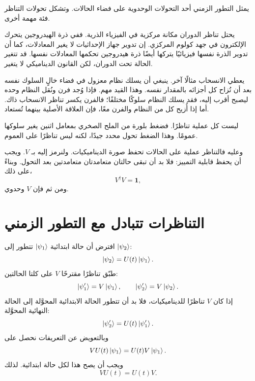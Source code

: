 يمثل التطور الزمني أحد التحولات الوحدوية على فضاء الحالات. وتشكل تحولات التناظر فئة مهمة أخرى.

يحتل تناظر الدوران مكانة مركزية في الفيزياء الذرية. ففي ذرة الهيدروجين يتحرك الإلكترون في جهد كولوم المركزي. إن تدوير جهاز الإحداثيات لا يغير المعادلات، كما أن تدوير الذرة نفسها فيزيائيًا يتركها أيضًا ذرة هيدروجين تحكمها المعادلات نفسها. قد تتغير الحالة تحت الدوران، لكن القانون الديناميكي لا يتغير.

يعطي الانسحاب مثالًا آخر. ينبغي أن يسلك نظام معزول في فضاء خالٍ السلوك نفسه بعد أن تُزاح كل أجزائه بالمقدار نفسه. وهذا القيد مهم. فإذا وُجد فرن ونُقل النظام وحده ليصبح أقرب إليه، فقد يسلك النظام سلوكًا مختلفًا؛ فالفرن يكسر تناظر الانسحاب ذاك. أما إذا أُزيح كل من النظام والفرن معًا، فإن العلاقة الأصلية بينهما تُستعاد.

ليست كل عملية تناظرًا. فضغط بلورة من الملح الصخري بمعامل اثنين يغير سلوكها عمومًا. وهذا الضغط تحول محدد جيدًا، لكنه ليس تناظرًا على العموم.

وعليه فالتناظر عملية على الحالات تحفظ صورة الديناميكيات. ولنرمز إليه بـ \(V\). ويجب أن يحفظ قابلية التمييز: فلا بد أن تبقى حالتان متعامدتان متعامدتين بعد التحول. وبناءً على ذلك،
\begin{equation}
V^\dagger V=\mathbf 1,
\end{equation}
ومن ثم فإن \(V\) وحدوي.

\section{التناظرات تتبادل مع التطور الزمني}

افترض أن حالة ابتدائية \(\left\lvert\psi_1\right\rangle\) تتطور إلى \(\left\lvert\psi_2\right\rangle\):
\begin{equation}
\left\lvert\psi_2\right\rangle=U(t)\left\lvert\psi_1\right\rangle.
\end{equation}
طبّق تناظرًا مقترحًا \(V\) على كلتا الحالتين:
\begin{equation}
\left\lvert\psi_1'\right\rangle=V\left\lvert\psi_1\right\rangle,
\qquad
\left\lvert\psi_2'\right\rangle=V\left\lvert\psi_2\right\rangle.
\end{equation}
إذا كان \(V\) تناظرًا للديناميكيات، فلا بد أن تتطور الحالة الابتدائية المحوَّلة إلى الحالة النهائية المحوَّلة:
\begin{equation}
\left\lvert\psi_2'\right\rangle=U(t)\left\lvert\psi_1'\right\rangle.
\end{equation}
وبالتعويض عن التعريفات نحصل على
\begin{equation}
VU(t)\left\lvert\psi_1\right\rangle
=
U(t)V\left\lvert\psi_1\right\rangle.
\end{equation}
ويجب أن يصح هذا لكل حالة ابتدائية. لذلك
\begin{equation}
VU(t)=U(t)V.
\end{equation}

